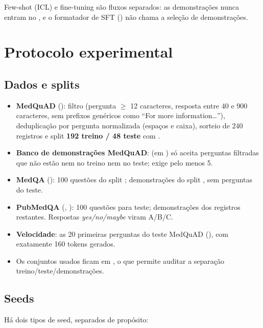 \documentclass[11pt]{article}
\begin{document}
Few-shot (ICL) e fine-tuning são fluxos separados: as demonstrações nunca entram no , e o formatador de SFT () não chama a seleção de demonstrações.

\section{Protocolo experimental}

\subsection{Dados e splits}

\begin{itemize}
\item \textbf{MedQuAD} (): filtro  (pergunta $\geq$ 12 caracteres, resposta entre 40 e 900 caracteres, sem prefixos genéricos como ``For more information\ldots''), deduplicação por pergunta normalizada (espaços e caixa), sorteio de 240 registros e split \textbf{192 treino / 48 teste} com .
\item \textbf{Banco de demonstrações MedQuAD}:  (em ) só aceita perguntas filtradas que não estão nem no treino nem no teste; exige pelo menos 5.
\item \textbf{MedQA} (): 100 questões do split ; demonstrações do split , sem perguntas do teste.
\item \textbf{PubMedQA} (, ): 100 questões para teste; demonstrações dos registros restantes. Respostas \textit{yes/no/maybe} viram A/B/C.
\item \textbf{Velocidade}: as 20 primeiras perguntas do teste MedQuAD (), com exatamente 160 tokens gerados.
\item Os conjuntos usados ficam em , o que permite auditar a separação treino/teste/demonstrações.
\end{itemize}

\subsection{Seeds}

Há dois tipos de seed, separados de propósito:
\end{document}
